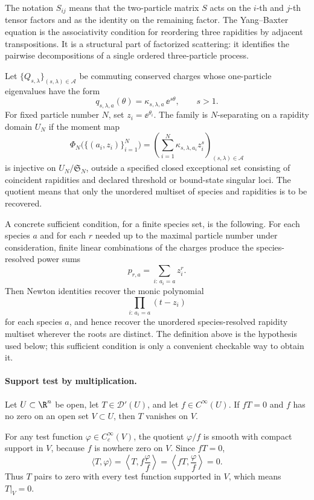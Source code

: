 The notation \(S_{ij}\) means that the two-particle matrix \(S\) acts on the
\(i\)-th and \(j\)-th tensor factors and as the identity on the remaining
factor.  The Yang--Baxter equation is the associativity condition for
reordering three rapidities by adjacent transpositions.  It is a structural
part of factorized scattering: it identifies the pairwise decompositions of a
single ordered three-particle process.

\begin{definition}
\label{def:separating-higher-spin-family}
Let \(\{Q_{s,\lambda}\}_{(s,\lambda)\in\mathcal A}\) be commuting conserved
charges whose one-particle eigenvalues have the form
\[
  q_{s,\lambda,a}(\theta)=\kappa_{s,\lambda,a}\,\ee^{s\theta},
  \qquad s>1.
\]
For fixed particle number \(N\), set \(z_i=\ee^{\theta_i}\).  The family is
\(N\)-separating on a rapidity domain \(U_N\) if the moment map
\[
  \Phi_N\bigl(\{(a_i,z_i)\}_{i=1}^N\bigr)
  =
  \left(
    \sum_{i=1}^N\kappa_{s,\lambda,a_i}z_i^s
  \right)_{(s,\lambda)\in\mathcal A}
\]
is injective on \(U_N/\mathfrak S_N\), outside a specified closed exceptional
set consisting of coincident rapidities and declared threshold or bound-state
singular loci.  The quotient means that only the unordered multiset of
species and rapidities is to be recovered.

A concrete sufficient condition, for a finite species set, is the following.
For each species \(a\) and for each \(r\) needed up to the maximal particle
number under consideration, finite linear combinations of the charges produce
the species-resolved power sums
\[
  p_{r,a}=\sum_{i:\,a_i=a}z_i^r .
\]
Then Newton identities recover the monic polynomial
\[
  \prod_{i:\,a_i=a}(t-z_i)
\]
for each species \(a\), and hence recover the unordered species-resolved
rapidity multiset wherever the roots are distinct.  The definition above is
the hypothesis used below; this sufficient condition is only a convenient
checkable way to obtain it.
\end{definition}

\paragraph{Support test by multiplication.}
Let \(U\subset\R^n\) be open, let \(T\in\mathcal D'(U)\), and let
\(f\in C^\infty(U)\).  If \(fT=0\) and \(f\) has no zero on an open set
\(V\subset U\), then \(T\) vanishes on \(V\).

For any test function \(\varphi\in C_c^\infty(V)\), the quotient
\(\varphi/f\) is smooth with compact support in \(V\), because \(f\) is
nowhere zero on \(V\).  Since \(fT=0\),
\[
  \langle T,\varphi\rangle
  =
  \left\langle T,f\frac{\varphi}{f}\right\rangle
  =
  \left\langle fT,\frac{\varphi}{f}\right\rangle
  =
  0 .
\]
Thus \(T\) pairs to zero with every test function supported in \(V\), which
means \(T|_V=0\).

